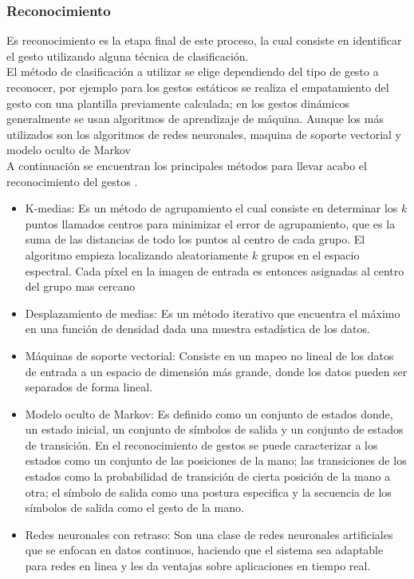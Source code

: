 \subsubsection{Reconocimiento}\label{sssec:EtapaReconocimiento}

Es reconocimiento es la etapa final de este proceso, la cual consiste en identificar el gesto utilizando alguna técnica de clasificación.\\
El método de clasificación a utilizar se elige dependiendo del tipo de gesto a reconocer, por ejemplo para los gestos estáticos se realiza el empatamiento del gesto con una plantilla previamente calculada; en los gestos dinámicos generalmente  se usan algoritmos de aprendizaje de máquina. Aunque los más utilizados son los algoritmos de redes neuronales, maquina de soporte vectorial y modelo oculto de Markov\\ 
A continuación se encuentran los principales métodos para llevar acabo el reconocimiento del gestos \citep{Rautaray2012}. 
\begin{itemize}
	\item K-medias: Es un método de agrupamiento el cual consiste en determinar los $k$ puntos llamados centros para minimizar el error de agrupamiento, que es la suma de las distancias de todo los puntos al centro de cada grupo. El algoritmo empieza localizando aleatoriamente $k$ grupos en el espacio espectral. Cada p\'ixel en la imagen de entrada es entonces asignadas al centro del grupo mas cercano  
	\item Desplazamiento de medias: Es un método iterativo que encuentra el máximo en una función de densidad dada una muestra estadística de los datos.
	\item Máquinas de soporte vectorial: Consiste en un mapeo no lineal de los datos de entrada a un espacio de dimensi\'on m\'as grande, donde los datos pueden ser separados de forma lineal.  
	\item Modelo oculto de Markov: Es definido como un conjunto de estados donde, un estado inicial, un conjunto de símbolos de salida y un conjunto de estados de transición. En el reconocimiento de gestos se puede caracterizar a    los estados como un conjunto de las posiciones de la mano; las  transiciones de los estados como la probabilidad de transición de cierta posición de la mano a otra; el símbolo de salida como una postura especifica y la secuencia de los símbolos de salida como  el gesto de la mano.   
	\item Redes neuronales con retraso: Son una clase de redes neuronales artificiales que se enfocan en datos continuos, haciendo que el sistema sea adaptable para redes en linea y les da ventajas sobre aplicaciones en tiempo real. 
\end{itemize}  



